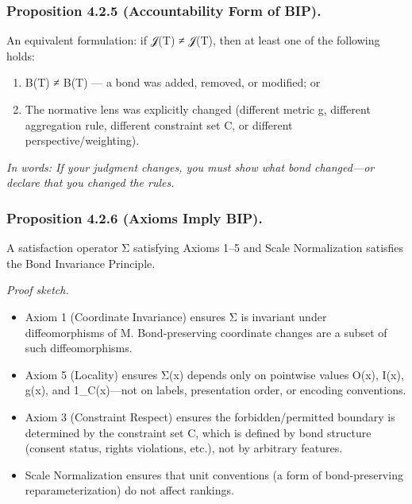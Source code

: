 \documentclass[12pt]{article}
\theoremstyle{plain}
\theoremstyle{definition}
\theoremstyle{remark}
\begin{document}
\subsubsection{\texorpdfstring{Proposition 4.2.5 (Accountability Form of
BIP).
}{Proposition 4.2.5 (Accountability Form of BIP). }}\label{proposition-4.2.5-accountability-form-of-bip.}

An equivalent formulation: if 𝒥(T) ≠ 𝒥(T\textquotesingle), then at least
one of the following holds:

\begin{enumerate}
\item
  B(T) ≠ B(T\textquotesingle) --- a bond was added, removed, or
  modified; or
\item
  The normative lens was explicitly changed (different metric g,
  different aggregation rule, different constraint set C, or different
  perspective/weighting).
\end{enumerate}

\emph{In words: If your judgment changes, you must show what bond
changed---or declare that you changed the rules.}

\subsubsection{\texorpdfstring{Proposition 4.2.6 (Axioms Imply BIP).
}{Proposition 4.2.6 (Axioms Imply BIP). }}\label{proposition-4.2.6-axioms-imply-bip.}

A satisfaction operator Σ satisfying Axioms 1--5 and Scale Normalization
satisfies the Bond Invariance Principle.

\emph{Proof sketch.}

\begin{itemize}
\item
  Axiom 1 (Coordinate Invariance) ensures Σ is invariant under
  diffeomorphisms of M. Bond-preserving coordinate changes are a subset
  of such diffeomorphisms.
\item
  Axiom 5 (Locality) ensures Σ(x) depends only on pointwise values O(x),
  I(x), g(x), and 1\_C(x)---not on labels, presentation order, or
  encoding conventions.
\item
  Axiom 3 (Constraint Respect) ensures the forbidden/permitted boundary
  is determined by the constraint set C, which is defined by bond
  structure (consent status, rights violations, etc.), not by arbitrary
  features.
\item
  Scale Normalization ensures that unit conventions (a form of
  bond-preserving reparameterization) do not affect rankings.
\end{itemize}
\end{document}
